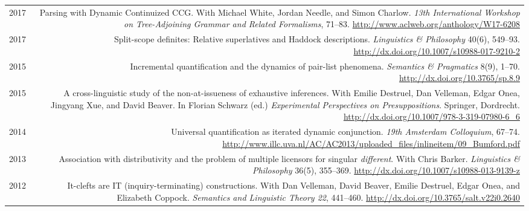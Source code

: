 \documentclass[12pt]{article}
\newcommand{\doi}[1]{\url{http://dx.doi.org/#1}}
\newcommand{\refmark}{\textcolor{gray}{\textdagger}}
\newcommand{\flag}{\llap{\refmark~~}}
\begin{document}
\begin{longtable}{LR}
  2017  & Parsing with Dynamic Continuized CCG.\newline
          With Michael White, Jordan Needle, and Simon Charlow.\newline
          \textit{13th International Workshop on Tree-Adjoining Grammar and
          Related Formalisms}, 71--83.\newline
          \url{http://www.aclweb.org/anthology/W17-6208}\\
  \flag%
  2017  & Split-scope definites: Relative superlatives and Haddock
          descriptions.\newline
          \textit{Linguistics \& Philosophy} 40(6), 549--93.\newline
          \doi{10.1007/s10988-017-9210-2}\\
  \flag%
  2015  & Incremental quantification and the dynamics of pair-list phenomena.\newline
          \textit{Semantics \& Pragmatics} 8(9), 1--70.\newline
          \doi{10.3765/sp.8.9}\\
  2015  & A cross-linguistic study of the non-at-issueness of exhaustive
          inferences.\newline
          With Emilie Destruel, Dan Velleman, Edgar Onea, Jingyang Xue, and
          David Beaver.\newline
          In Florian Schwarz (ed.) \textit{Experimental Perspectives on
          Presuppositions}. Springer, Dordrecht.\newline
          \doi{10.1007/978-3-319-07980-6_6}\\ %
  2014  & Universal quantification as iterated dynamic conjunction.\newline
          \textit{19th Amsterdam Colloquium}, 67--74.\newline
          \url{http://www.illc.uva.nl/AC/AC2013/uploaded_files/inlineitem/09_Bumford.pdf}\\
  \flag%
  2013  & Association with distributivity and the problem of multiple
          licensors for singular \textit{different}.\newline
          With Chris Barker.\newline
          \textit{Linguistics \& Philosophy} 36(5), 355--369.\newline
          \doi{10.1007/s10988-013-9139-z}\\ %
  2012  & It-clefts are IT (inquiry-terminating) constructions.\newline
          With Dan Velleman, David Beaver, Emilie Destruel, Edgar Onea, and
          Elizabeth Coppock.\newline
          \textit{Semantics and Linguistic Theory 22}, 441--460.\newline
          \doi{10.3765/salt.v22i0.2640}
\end{longtable}
\endgroup
\end{document}
